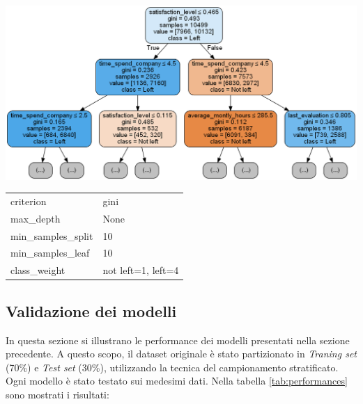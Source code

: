\documentclass[a4paper]{article}
\begin{document}
\noindent \begin{minipage}{\textwidth}

  \begin{minipage}[b]{0.65\textwidth}
    \centering

    \includegraphics[width=\textwidth]{albero1}
  \end{minipage}
  \hfill
  \begin{minipage}[b]{0.3\textwidth}
    \centering
    \setlength{\tabcolsep}{10pt} %
\renewcommand{\arraystretch}{1.5} %
    \begin{tabularx}{\textwidth}{|lX|}
	\hline
	criterion                & gini      \\
	max\_depth               & None         \\
	min\_samples\_split      & 10         \\
	min\_samples\_leaf       & 10         \\
	class\_weight            & not left=1, left=4     \\\hline
	\end{tabularx}
          \label{img:model4}
    \end{minipage}
  \end{minipage}

\subsection{Validazione dei modelli}

In questa sezione si illustrano le performance dei modelli presentati nella sezione precedente. A questo scopo, il dataset originale è stato partizionato in \textit{Traning set} (70\%) e \textit{Test set} (30\%), utilizzando la tecnica del campionamento stratificato. Ogni modello è stato testato sui medesimi dati. Nella tabella \ref{tab:performances} sono mostrati i risultati: \newline
\end{document}
